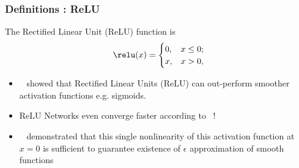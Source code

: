 \begin{frame}
 \frametitle{Definitions : ReLU}
\begin{definition}{The Rectified Linear Unit (ReLU) function is}
\label{relu}
   \[\relu(x) = \begin{cases} 0, & x \leq 0;\\
       x, & x > 0,\end{cases}\]
 \end{definition}

\begin{itemize}
    \item ~\citet{glorot2011deep} showed that
      Rectified Linear Units (ReLU) can out-perform smoother
      activation functions e.g. sigmoids.
    \item ReLU Networks even converge faster according to
      ~\citet{nair_rectified_nodate}!
    \item  ~\citet{petersen2018optimal} demonstrated that this single
      nonlinearity of this activation function
at $x = 0$ is sufficient to guarantee existence of $\epsilon$ approximation of smooth functions
\end{itemize}
\end{frame}








